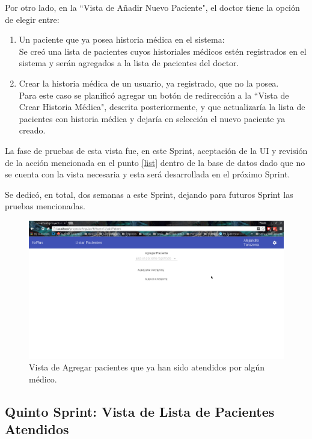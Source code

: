     Por otro lado, en la ``Vista de Añadir Nuevo Paciente", el doctor tiene la opción de elegir entre:
    
    \begin{enumerate}
        \item\label{list} Un paciente que ya posea historia médica en el sistema:\\
        Se creó una lista de pacientes cuyos historiales médicos estén registrados en el sistema y serán agregados a la lista de pacientes del doctor.
        \item\label{new} Crear la historia médica de un usuario, ya registrado, que no la posea.\\
        Para este caso se planificó agregar un botón de redirección a la ``Vista de Crear Historia Médica", descrita posteriormente, y que actualizaría la lista de pacientes con historia médica y dejaría en selección el nuevo paciente ya creado.
    \end{enumerate}
    
    La fase de pruebas de esta vista fue, en este Sprint, aceptación de la UI y revisión de la acción mencionada en el punto \ref{list} dentro de la base de datos dado que no se cuenta con la vista necesaria y esta será desarrollada en el próximo Sprint.
    
    Se dedicó, en total, dos semanas a este Sprint, dejando para futuros Sprint las pruebas mencionadas.
    
    \begin{figure}[htbp!]
        \begin{center}
            \includegraphics[width=.8\textwidth]{figures/p8}
        \end{center}
        \caption{Vista de Agregar pacientes que ya han sido atendidos por algún médico.}
        \label{Agregar}
    \end{figure}
    
    \subsection{Quinto Sprint: Vista de Lista de Pacientes Atendidos}
    
